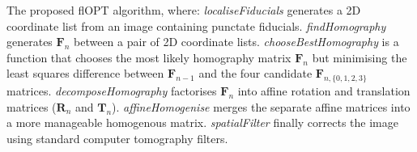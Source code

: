 \documentclass{osa-article}
\begin{document}
\begin{algorithm}
  \begin{algorithmic}
    \caption{The proposed flOPT algorithm, where:
      \emph{localiseFiducials} generates a 2D coordinate list from an image containing punctate fiducials.
      \emph{findHomography} generates \(\mathbf{F}_n\) between a pair of 2D coordinate lists.
      \emph{chooseBestHomography} is a function that chooses the most likely homography matrix \(\mathbf{F}_n\) but minimising the least squares difference between \(\mathbf{F}_{n-1}\) and the four candidate \(\mathbf{F}_{n,\{0,1,2,3\}}\) matrices.
      \emph{decomposeHomography} factorises \(\mathbf{F}_n\) into affine rotation and translation matrices (\(\mathbf{R}_n\) and  \(\mathbf{T}_n\)).
      \emph{affineHomogenise} merges the separate affine matrices into a more manageable homogenous matrix.
      \emph{spatialFilter} finally corrects the image using standard computer tomography filters.
    }
    \ENDWHILE{}
  \end{algorithmic}
\end{algorithm}
\end{document}
